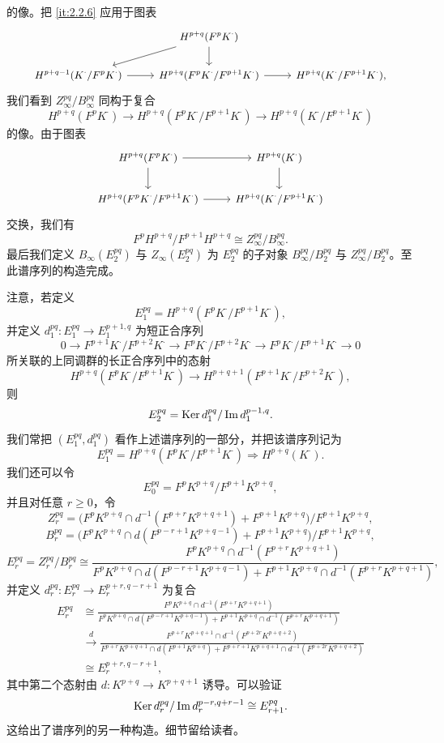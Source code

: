 的像。把 \ref{it:2.2.6} 应用于图表
\[\begin{tikzcd}[column sep=2.4em,row sep=1.7em,cells={nodes={font=\small}}]
& H^{p+q}(F^pK^{\cdot}) \arrow[dl] \arrow[d] & \\
H^{p+q-1}(K^{\cdot}/F^pK^{\cdot}) \arrow[r] & H^{p+q}(F^pK^{\cdot}/F^{p+1}K^{\cdot}) \arrow[r] & H^{p+q}(K^{\cdot}/F^{p+1}K^{\cdot}),
\end{tikzcd}\]
我们看到 $Z_\infty^{pq}/B_\infty^{pq}$ 同构于复合
\[
H^{p+q}(F^pK^{\cdot})\to H^{p+q}(F^pK^{\cdot}/F^{p+1}K^{\cdot})\to H^{p+q}(K^{\cdot}/F^{p+1}K^{\cdot})
\]
的像。由于图表
\[\begin{tikzcd}[column sep=2.4em,row sep=1.9em,cells={nodes={font=\small}}]
H^{p+q}(F^pK^{\cdot}) \arrow[r] \arrow[d] & H^{p+q}(K^{\cdot}) \arrow[d] \\
H^{p+q}(F^pK^{\cdot}/F^{p+1}K^{\cdot}) \arrow[r] & H^{p+q}(K^{\cdot}/F^{p+1}K^{\cdot})
\end{tikzcd}\]
交换，我们有
\[
F^pH^{p+q}/F^{p+1}H^{p+q}\cong Z_\infty^{pq}/B_\infty^{pq}.
\]
最后我们定义 $B_\infty(E_2^{pq})$ 与 $Z_\infty(E_2^{pq})$ 为 $E_2^{pq}$ 的子对象 $B_\infty^{pq}/B_2^{pq}$ 与 $Z_\infty^{pq}/B_2^{pq}$。至此谱序列的构造完成。

注意，若定义
\[
E_1^{pq}=H^{p+q}(F^pK^{\cdot}/F^{p+1}K^{\cdot}),
\]
并定义 $d_1^{pq}\colon E_1^{pq}\to E_1^{p+1,q}$ 为短正合序列
\[
0\to F^{p+1}K^{\cdot}/F^{p+2}K^{\cdot}\to F^pK^{\cdot}/F^{p+2}K^{\cdot}\to F^pK^{\cdot}/F^{p+1}K^{\cdot}\to 0
\]
所关联的上同调群的长正合序列中的态射
\[
H^{p+q}(F^pK^{\cdot}/F^{p+1}K^{\cdot})\to H^{p+q+1}(F^{p+1}K^{\cdot}/F^{p+2}K^{\cdot}),
\]
则
\[
E_2^{pq}=\operatorname{Ker} d_1^{pq}/\operatorname{Im} d_1^{p-1,q}.
\]
我们常把 $(E_1^{pq},d_1^{pq})$ 看作上述谱序列的一部分，并把该谱序列记为
\[
E_1^{pq}=H^{p+q}(F^pK^{\cdot}/F^{p+1}K^{\cdot})\Rightarrow H^{p+q}(K^{\cdot}).
\]
我们还可以令
\[
E_0^{pq}=F^pK^{p+q}/F^{p+1}K^{p+q},
\]
并且对任意 $r\ge 0$，令
\[
Z_r^{pq}=\bigl(F^pK^{p+q}\cap d^{-1}(F^{p+r}K^{p+q+1})+F^{p+1}K^{p+q}\bigr)/F^{p+1}K^{p+q},
\]
\[
B_r^{pq}=\bigl(F^pK^{p+q}\cap d(F^{p-r+1}K^{p+q-1})+F^{p+1}K^{p+q}\bigr)/F^{p+1}K^{p+q},
\]
\[
E_r^{pq}=Z_r^{pq}/B_r^{pq}\cong\frac{F^pK^{p+q}\cap d^{-1}(F^{p+r}K^{p+q+1})}{F^pK^{p+q}\cap d(F^{p-r+1}K^{p+q-1})+F^{p+1}K^{p+q}\cap d^{-1}(F^{p+r}K^{p+q+1})},
\]
并定义 $d_r^{pq}\colon E_r^{pq}\to E_r^{p+r,q-r+1}$ 为复合
\begin{align*}
E_r^{pq}&\cong\frac{F^pK^{p+q}\cap d^{-1}(F^{p+r}K^{p+q+1})}{F^pK^{p+q}\cap d(F^{p-r+1}K^{p+q-1})+F^{p+1}K^{p+q}\cap d^{-1}(F^{p+r}K^{p+q+1})}\\
&\xrightarrow{\ d\ }\frac{F^{p+r}K^{p+q+1}\cap d^{-1}(F^{p+2r}K^{p+q+2})}{F^{p+r}K^{p+q+1}\cap d(F^{p+1}K^{p+q})+F^{p+r+1}K^{p+q+1}\cap d^{-1}(F^{p+2r}K^{p+q+2})}\\
&\cong E_r^{p+r,q-r+1},
\end{align*}
其中第二个态射由 $d\colon K^{p+q}\to K^{p+q+1}$ 诱导。可以验证
\[
\operatorname{Ker} d_r^{pq}/\operatorname{Im} d_r^{p-r,q+r-1}\cong E_{r+1}^{pq}.
\]
这给出了谱序列的另一种构造。细节留给读者。

